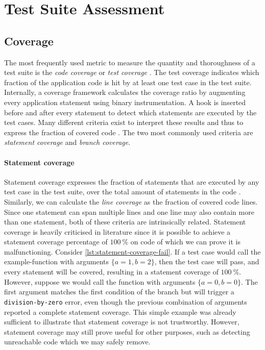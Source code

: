
\section{Test Suite Assessment}

\subsection{Coverage}
The most frequently used metric to measure the quantity and thoroughness of a test suite is the \emph{code coverage} or \emph{test coverage} \cite[p.~467]{8016712}. The test coverage indicates which fraction of the application code is hit by at least one test case in the test suite. Internally, a coverage framework calculates the coverage ratio by augmenting every application statement using binary instrumentation. A hook is inserted before and after every statement to detect which statements are executed by the test cases. Many different criteria exist to interpret these results and thus to express the fraction of covered code \cite{Myers:2011:AST:2161638}. The two most commonly used criteria are \emph{statement coverage} and \emph{branch coverage}.

\paragraph*{Statement coverage} Statement coverage expresses the fraction of statements that are executed by any test case in the test suite, over the total amount of statements in the code \cite{6588537}. Similarly, we can calculate the \emph{line coverage} as the fraction of covered code lines. Since one statement can span multiple lines and one line may also contain more than one statement, both of these criteria are intrinsically related. Statement coverage is heavily criticised in literature \cite[p.~37]{Myers:2011:AST:2161638} since it is possible to achieve a statement coverage percentage of $\SI{100}{\percent}$ on code of which we can prove it is malfunctioning. Consider \cref{lst:statement-coverage-fail}. If a test case would call the example-function with arguments $\{a = 1, b = 2\}$, then the test case will pass, and every statement will be covered, resulting in a statement coverage of $\SI{100}{\percent}$. However, suppose we would call the function with arguments $\{a = 0, b = 0\}$. The first argument matches the first condition of the branch but will trigger a \texttt{division-by-zero} error, even though the previous combination of arguments reported a complete statement coverage. This simple example was already sufficient to illustrate that statement coverage is not trustworthy. However, statement coverage may still prove useful for other purposes, such as detecting unreachable code which we may safely remove.

